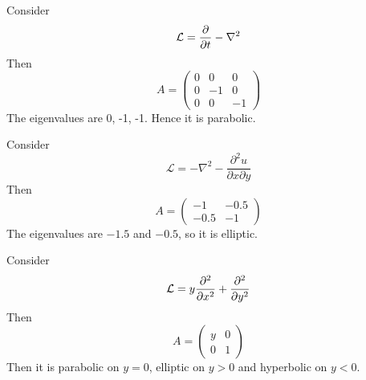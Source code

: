 \documentclass[12pt]{article}
\begin{document}
\begin{ex}[Heat]
    Consider
    $$\mathcal L = \frac{\partial }{\partial t} - \nabla^2$$
    Then
    $$A = \begin{pmatrix} 0 & 0 & 0 \\ 0 & -1 & 0 \\ 0 & 0 & -1 \end{pmatrix}$$
    The eigenvalues are 0, -1, -1. Hence it is parabolic.
\end{ex}

\begin{ex}
    Consider
    $$\mathcal L = -\nabla^2 - \frac{\partial^2u}{\partial x\partial y}$$
    Then
    $$A = \begin{pmatrix} -1 & -0.5 \\ -0.5 & -1 \end{pmatrix}$$
    The eigenvalues are $-1.5$ and $-0.5$, so it is elliptic.
\end{ex}

\begin{ex}
    Consider
    $$\mathcal L = y\frac{\partial ^2}{\partial x^2} + \frac{\partial ^2}{\partial y^2}$$
    Then
    $$A = \begin{pmatrix} y & 0 \\ 0 & 1 \end{pmatrix}$$
    Then it is parabolic on $y=0$, elliptic on $y>0$ and hyperbolic on $y<0$.
\end{ex}
\end{document}
